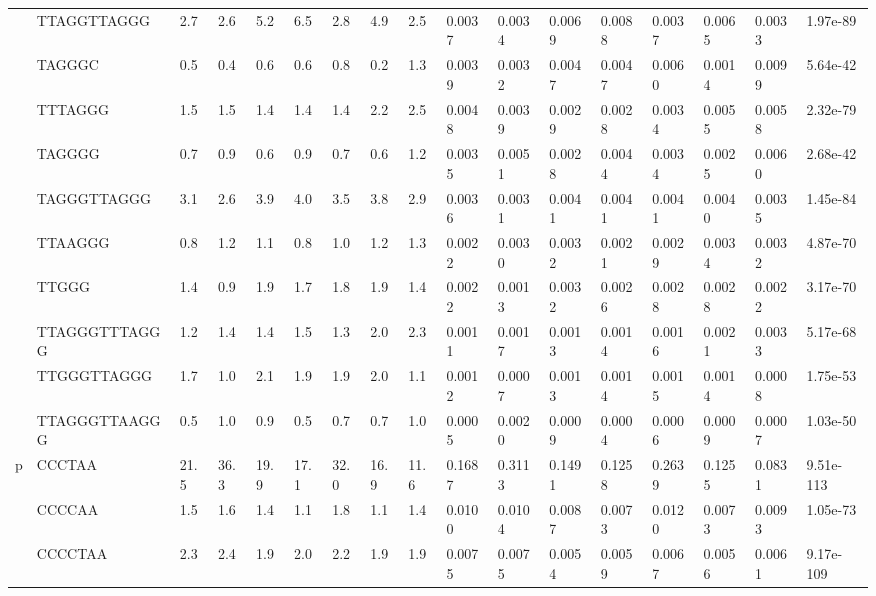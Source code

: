\begin{landscape}
\begin{samepage}
\begin{table}[h!]
\begin{tabular}{lllllllllllllllll}
\textbf{}    &    TTAGGTTAGGG &  2.7  &  2.6  &  5.2  &  6.5  &  2.8  &  4.9  &  2.5  &  0.0037 &  0.0034 &  0.0069 &  0.0088 &  0.0037 &  0.0065 &  0.0033 &   1.97e-89 \\
\textbf{}    &         TAGGGC &  0.5  &  0.4  &  0.6  &  0.6  &  0.8  &  0.2  &  1.3  &  0.0039 &  0.0032 &  0.0047 &  0.0047 &  0.0060 &  0.0014 &  0.0099 &   5.64e-42 \\
\textbf{}    &        TTTAGGG &  1.5  &  1.5  &  1.4  &  1.4  &  1.4  &  2.2  &  2.5  &  0.0048 &  0.0039 &  0.0029 &  0.0028 &  0.0034 &  0.0055 &  0.0058 &   2.32e-79 \\
\textbf{}    &         TAGGGG &  0.7  &  0.9  &  0.6  &  0.9  &  0.7  &  0.6  &  1.2  &  0.0035 &  0.0051 &  0.0028 &  0.0044 &  0.0034 &  0.0025 &  0.0060 &   2.68e-42 \\
\textbf{}    &    TAGGGTTAGGG &  3.1  &  2.6  &  3.9  &  4.0  &  3.5  &  3.8  &  2.9  &  0.0036 &  0.0031 &  0.0041 &  0.0041 &  0.0041 &  0.0040 &  0.0035 &   1.45e-84 \\
\textbf{}    &        TTAAGGG &  0.8  &  1.2  &  1.1  &  0.8  &  1.0  &  1.2  &  1.3  &  0.0022 &  0.0030 &  0.0032 &  0.0021 &  0.0029 &  0.0034 &  0.0032 &   4.87e-70 \\
\textbf{}    &          TTGGG &  1.4  &  0.9  &  1.9  &  1.7  &  1.8  &  1.9  &  1.4  &  0.0022 &  0.0013 &  0.0032 &  0.0026 &  0.0028 &  0.0028 &  0.0022 &   3.17e-70 \\
\textbf{}    &  TTAGGGTTTAGGG &  1.2  &  1.4  &  1.4  &  1.5  &  1.3  &  2.0  &  2.3  &  0.0011 &  0.0017 &  0.0013 &  0.0014 &  0.0016 &  0.0021 &  0.0033 &   5.17e-68 \\
\textbf{}    &    TTGGGTTAGGG &  1.7  &  1.0  &  2.1  &  1.9  &  1.9  &  2.0  &  1.1  &  0.0012 &  0.0007 &  0.0013 &  0.0014 &  0.0015 &  0.0014 &  0.0008 &   1.75e-53 \\
\textbf{}    &  TTAGGGTTAAGGG &  0.5  &  1.0  &  0.9  &  0.5  &  0.7  &  0.7  &  1.0  &  0.0005 &  0.0020 &  0.0009 &  0.0004 &  0.0006 &  0.0009 &  0.0007 &   1.03e-50 \\
p            &         CCCTAA & 21.5  & 36.3  & 19.9  & 17.1  & 32.0  & 16.9  & 11.6  &  0.1687 &  0.3113 &  0.1491 &  0.1258 &  0.2639 &  0.1255 &  0.0831 &  9.51e-113 \\
\textbf{}    &         CCCCAA &  1.5  &  1.6  &  1.4  &  1.1  &  1.8  &  1.1  &  1.4  &  0.0100 &  0.0104 &  0.0087 &  0.0073 &  0.0120 &  0.0073 &  0.0093 &   1.05e-73 \\
\textbf{}    &        CCCCTAA &  2.3  &  2.4  &  1.9  &  2.0  &  2.2  &  1.9  &  1.9  &  0.0075 &  0.0075 &  0.0054 &  0.0059 &  0.0067 &  0.0056 &  0.0061 &  9.17e-109 \\

\end{tabular}
\end{table}
\end{samepage}
\end{landscape}
